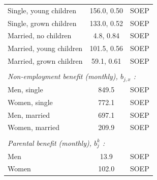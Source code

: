 \begin{tabular}{lcc}
Single, young children  &        156.0,         0.50 & SOEP \\
Single, grown children  &        133.0,         0.52& SOEP  \\
Married, no children  &          4.8,         0.84 & SOEP  \\
Married, young children  &        101.5,         0.56& SOEP \\
Married, grown children  &         59.1,         0.61 & SOEP  \\
 & \\  
\multicolumn{3}{l}{\textit{Non-employment benefit (monthly), $b_{j,x}$ :}}  \\
Men, single  &        849.5 & SOEP  \\
Women, single  &        772.1  & SOEP \\
Men, married  &        697.1 & SOEP  \\
Women, married  &        209.9  & SOEP \\
 & \\  
\multicolumn{3}{l}{\textit{Parental benefit (monthly), $b^k_{j}$ :}}  \\
Men  &         13.9  & SOEP \\
Women  &        102.0 & SOEP  \\
\hline\hline 
\end{tabular} 
